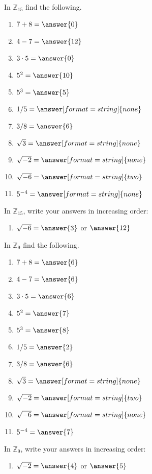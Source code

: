 \documentclass[space,nooutcomes,handout]{ximera}
\begin{document}
\begin{problem}
In $\mathbb{Z}_{15}$ find the following. 
\begin{enumerate}
\item $7 + 8 =\answer{0}$
\item $4 - 7 =\answer{12}$
\item $3\cdot 5 =\answer{0}$
\item $5^2 =\answer{10}$
\item $5^3 =\answer{5}$ 
\item $1/5 =\answer[format=string]{none}$
\item $3/8 =\answer{6}$ 
\item $\sqrt{3} =\answer[format=string]{none}$
\item $\sqrt{-2} =\answer[format=string]{none}$  
\item $\sqrt{-6} =\answer[format=string]{two}$  
\item  $5^{-4}  =\answer[format=string]{none}$ 
\end{enumerate}
\begin{problem}
In $\mathbb{Z}_{15}$, write your answers in increasing order: 
\begin{enumerate}
\item $\sqrt{-6} =\answer{3}$ or $\answer{12}$  %
\end{enumerate}
\end{problem}
\end{problem}

\begin{problem}
In $\mathbb{Z}_{9}$ find the following. 
\begin{enumerate}
\item $7 + 8 =\answer{6}$
\item $4 - 7 =\answer{6}$
\item $3\cdot 5 =\answer{6}$
\item $5^2 =\answer{7}$
\item $5^3 =\answer{8}$ 
\item $1/5 =\answer{2}$
\item $3/8 =\answer{6}$ 
\item $\sqrt{3} =\answer[format=string]{none}$ 
\item $\sqrt{-2} =\answer[format=string]{two}$  %
\item $\sqrt{-6} =\answer[format=string]{none}$ 
\item  $5^{-4}  =\answer{7}$ 
\end{enumerate}
\begin{problem}
In $\mathbb{Z}_{9}$, write your answers in increasing order: 
\begin{enumerate}
\item $\sqrt{-2} =\answer{4}$ or $\answer{5}$  %
\end{enumerate}
\end{problem}
\end{problem}
\end{document}
